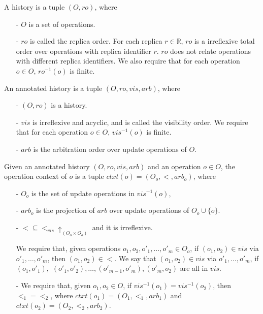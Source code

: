 A history is a tuple $(O,\mathit{ro})$, where

\begin{itemize}
\setlength{\itemsep}{0.5pt}
\item[-] $O$ is a set of operations.

\item[-] $\mathit{ro}$ is called the replica order. For each replica $r \in \mathbb{R}$, $\mathit{ro}$ is a irreflexive total order over operations with replica identifier $r$. $\mathit{ro}$ does not relate operations with different replica identifiers. We also require that for each operation $o \in O$, $\mathit{ro}^{-1}(o)$ is finite.
\end{itemize}

An annotated history is a tuple $(O,\mathit{ro},\mathit{vis},\mathit{arb})$, where

\begin{itemize}
\setlength{\itemsep}{0.5pt}
\item[-] $(O,\mathit{ro})$ is a history.

\item[-] $\mathit{vis}$ is irreflexive and acyclic, and is called the visibility order. We require that for each operation $o \in O$, $\mathit{vis}^{-1}(o)$ is finite.

\item[-] $\mathit{arb}$ is the arbitration order over update operations of $O$.
\end{itemize}


Given an annotated history $(O,\mathit{ro},\mathit{vis},\mathit{arb})$ and an operation $o \in O$, the operation context of $o$ is a tuple $ctxt(o)=(O_o,<,arb_o)$, where

\begin{itemize}
\setlength{\itemsep}{0.5pt}
\item[-] $O_o$ is the set of update operations in $\mathit{vis}^{-1}(o)$,

\item[-] $arb_o$ is the projection of $arb$ over update operations of $O_o \cup \{ o \}$.

\item[-] $< \subseteq <_{\mathit{vis}} \uparrow_{(O_o \times O_o)}$ and it is irreflexive.

We require that, given operations $o_1,o_2,o'_1,\ldots,o'_m \in O_o$, if $(o_1,o_2) \in \mathit{vis}$ via $o'_1,\ldots,o'_m$, then $(o_1,o_2) \in <$. We say that $(o_1,o_2) \in \mathit{vis}$ via $o'_1,\ldots,o'_m$, if $(o_1,o'_1),$ $(o'_1,o'_2), \ldots, (o'_{\mathit{m-1}},o'_m),(o'_m,o_2)$ are all in $\mathit{vis}$.

\item[-] {\color {red}We require that, given $o_1,o_2 \in O$, if $\mathit{vis}^{-1}(o_1) = \mathit{vis}^{-1}(o_2)$, then $<_1 = <_2$, where $ctxt(o_1)=(O_1,<_1,arb_1)$ and $ctxt(o_2)=(O_2,<_2,arb_2)$.} 
\end{itemize}

